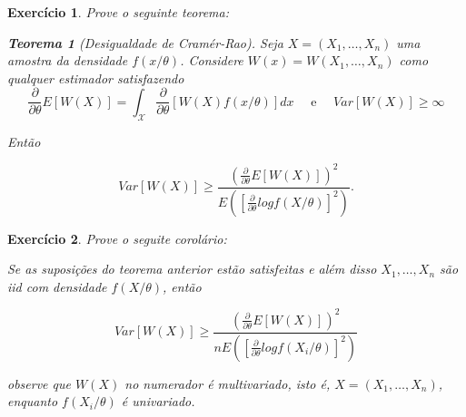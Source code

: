 \documentclass[letter,11pt]{article}
\newtheorem{exer}{Exercício}
\newtheorem{teo}{Teorema}
\begin{document}
%
%
%
%
%
%
%
%
%
%

\begin{exer} \rm
Prove o seguinte teorema:
  \begin{teo}[Desigualdade de Cramér-Rao]
       Seja $X=(X_1, \ldots, X_n)$ uma amostra da densidade $f(x/\theta)$. Considere $W(x)=W(X_1, \ldots, X_n)$ como qualquer estimador satisfazendo
       $$
       \frac{\partial}{\partial\theta}E[W(X)]=\int_{\mathcal{X}} \frac{\partial}{\partial\theta} [W(X)f(x/\theta)]dx \quad \mbox{ e } \quad Var[W(X)]\geq \infty
       $$
      
       Então
      
       $$
       Var[W(X)] \geq \frac{\left(\frac{\partial}{\partial \theta}E[W(X)] \right)^2}{E\left(\left[\frac{\partial}{\partial \theta}log f(X/\theta)\right]^2 \right)}.
       $$
  \end{teo}
\end{exer}



\begin{exer} \rm
Prove o seguite corolário:
 \begin{coro}
        Se as suposições do teorema anterior estão satisfeitas e além disso $X_1, \ldots, X_n$ são iid com densidade $f(X/\theta)$, então
    
       $$
       Var[W(X)] \geq \frac{\left(\frac{\partial}{\partial \theta}E[W(X)] \right)^2}{n E\left(\left[\frac{\partial}{\partial \theta}log f(X_i/\theta)\right]^2 \right)}
       $$
       
       observe que $W(X)$ no numerador é multivariado, isto é, $X=(X_1, \ldots, X_n)$, enquanto $f(X_i/\theta)$ é univariado.
    \end{coro}
\end{exer}
    
\end{document}
